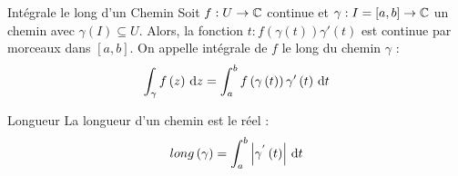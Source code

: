 \documentclass{cours}
\begin{document}
\begin{définition}{Intégrale le long d'un Chemin}{}
    Soit $f : U \to \mathbb{C}$ continue et $\gamma : I = \left[a, b\right] \to \mathbb{C}$ un chemin avec $\gamma\left(I\right) \subseteq U$. Alors, la fonction $t : f\left(\gamma\left(t\right)\right)\gamma'\left(t\right)$ est continue par morceaux dans $\left[a, b\right]$. On appelle intégrale de $f$ le long du chemin $\gamma$ : 
    \begin{equation*}
        \int_{\gamma}f\left(z\right){\rm \, d} z = \int_{a}^{b}f\left(\gamma\left(t\right)\right)\gamma'\left(t\right){\rm \, d} t
    \end{equation*}
\end{définition}

\begin{définition}{Longueur}{}
    La longueur d'un chemin est le réel : 
    \begin{equation*}
        long\left(\gamma\right) = \int_{a}^{b}\left|\gamma^{'}\left(t\right)\right|{\rm \, d} t
    \end{equation*}
\end{définition}
\end{document}
